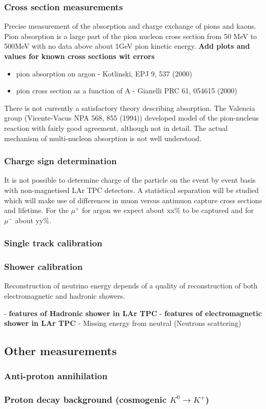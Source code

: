 \subsubsection{Cross section measurements}
Precise measurement of the  absorption and charge exchange of pions and kaons. Pion absorption is a large part of the pion nucleon cross section from 50 MeV to 500MeV with no data above about 1GeV pion kinetic energy. 
{\bf Add plots and values for known cross sections wit errors} 
\begin{itemize}
\item pion absorption on argon - Kotlinski, EPJ 9, 537 (2000)
\item pion cross section as a function of A - Gianelli PRC 61, 054615 (2000)
\end{itemize}
There is not currently a satisfactory theory describing absorption. The Valencia group (Vicente-Vacus NPA 568, 855 (1994)) developed model of    the pion-nucleus reaction with fairly good agreement, although not in detail. The actual  mechanism of multi-nucleon absorption
 is not well understood. 
 
\subsubsection{Charge sign determination}
It is not possible to determine charge of the particle on the event by event basis with non-magnetised LAr TPC detectors. A statistical separation will be studied which will make use of differences in muon versus antimuon capture cross sections and lifetime.
For the $\mu^+$ for argon we expect about xx\% to be captured and for $\mu^-$ about yy\%. 

\subsubsection{Single track calibration}

\subsubsection{Shower calibration}

Reconstruction of neutrino energy depends of a quality of reconstruction of both electromagnetic and hadronic showers. 

- {\bf features of Hadronic shower in LAr TPC}
- {\bf features of electromagnetic shower in LAr TPC}
- Missing energy from neutral (Neutrons scattering)
 

\subsection{Other measurements} 
\subsubsection{Anti-proton annihilation }
\subsubsection{Proton decay background (cosmogenic $K^{0} \to K^+$)}



